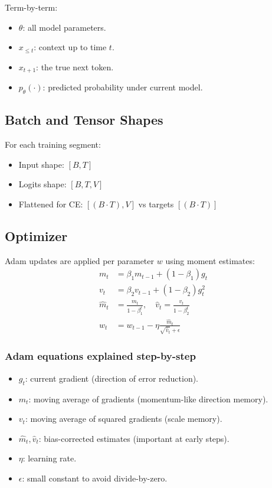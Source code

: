 \documentclass[a4paper,11pt]{article}
\begin{document}
Term-by-term:
\begin{itemize}[leftmargin=1.5em]
    \item $\theta$: all model parameters.
    \item $x_{\le t}$: context up to time $t$.
    \item $x_{t+1}$: the true next token.
    \item $p_\theta(\cdot)$: predicted probability under current model.
\end{itemize}

\subsection{Batch and Tensor Shapes}
For each training segment:
\begin{itemize}[leftmargin=1.5em]
    \item Input shape: $[B,T]$
    \item Logits shape: $[B,T,V]$
    \item Flattened for CE: $[(B\cdot T),V]$ vs targets $[(B\cdot T)]$
\end{itemize}

\subsection{Optimizer}
Adam updates are applied per parameter $w$ using moment estimates:
\begin{align*}
m_t &= \beta_1 m_{t-1} + (1-\beta_1)g_t \\
v_t &= \beta_2 v_{t-1} + (1-\beta_2)g_t^2 \\
\hat{m}_t &= \frac{m_t}{1-\beta_1^t},\quad \hat{v}_t=\frac{v_t}{1-\beta_2^t} \\
w_t &= w_{t-1} - \eta\frac{\hat{m}_t}{\sqrt{\hat{v}_t}+\epsilon}
\end{align*}

\subsubsection{Adam equations explained step-by-step}
\begin{itemize}[leftmargin=1.5em]
    \item $g_t$: current gradient (direction of error reduction).
    \item $m_t$: moving average of gradients (momentum-like direction memory).
    \item $v_t$: moving average of squared gradients (scale memory).
    \item $\hat{m}_t, \hat{v}_t$: bias-corrected estimates (important at early steps).
    \item $\eta$: learning rate.
    \item $\epsilon$: small constant to avoid divide-by-zero.
\end{itemize}
\end{document}
